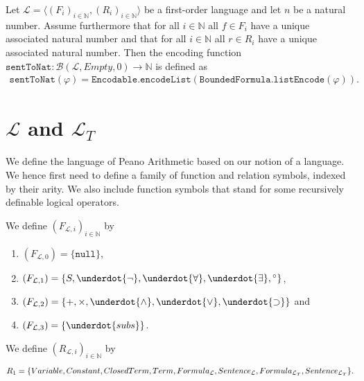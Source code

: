 \begin{definition}\label{def:S-To-N}
  \leanok
    Let $\mathcal{L} = \langle (F_i)_{i \in \mathbb{N}}, (R_i)_{i \in \mathbb{N}} \rangle$ be a first-order language and let $n$ be a natural number. Assume furthermore that for all $i \in \mathbb{N}$ all $f \in F_i$ have a unique associated natural number and that for all $i \in \mathbb{N}$ all $r \in R_i$ have a unique associated natural number. Then the encoding function $\texttt{sentToNat} : \mathcal{B}(\mathcal{L},Empty,0) \to \mathbb{N}$ is defined as 
    \begin{align*}
        \texttt{sentToNat}(\varphi) = \texttt{Encodable.encodeList}(\texttt{BoundedFormula.listEncode}(\varphi)).
    \end{align*}
\end{definition}

\section{$\mathcal{L}$ and $\mathcal{L}_T$}\label{subsec:lpa-lt}
We define the language of Peano Arithmetic based on our notion of a language. We hence first need to define a family of function and relation symbols, indexed by their arity. We also include function symbols that stand for some recursively definable logical operators.

\begin{definition}\label{def:L-Func}
  \leanok
  We define $(F_{\mathcal{L},i})_{i \in \mathbb{N}}$ by
  \begin{enumerate}
  \item $(F_{\mathcal{L},0}) = \{\texttt{null}\}$,
  \item $(F_{\mathcal{L},1}) = \{S, \underdot{\neg} , \underdot{\forall}, \underdot{\exists}, {^\circ}\}$,
  \item $(F_{\mathcal{L},2}) = \{+,\times, \underdot{\wedge}, \underdot{\vee}, \underdot{\supset}\}$ and
  \item $(F_{\mathcal{L},3}) = \{\underdot{subs}\}$.
  \end{enumerate}
\end{definition}

\begin{definition}\label{def:L-Rel}
  \leanok
  We define $(R_{\mathcal{L},i})_{i \in \mathbb{N}}$ by \[R_1 = \{Variable, Constant, ClosedTerm, Term, Formula_{\mathcal{L}}, Sentence_{\mathcal{L}}, \\ Formula_{\mathcal{L}_T}, Sentence_{\mathcal{L}_T}\}.\]
\end{definition}

